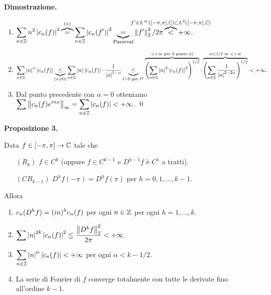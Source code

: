 \newpage

\textbf{Dimostrazione.}
\begin{enumerate}

	\item $\ds \sum_{n \in \Z} n^2 \left| c_n(f) \right|^2 \overbrace{=}^{(\ast)} \sum_{n \in \Z} \left| c_n(f') \right|^2
	\underbrace{=}_{\text{Parseval}} \norm{f'}_2^2 / 2\pi \overbrace{<}^{\mathclap{f' \in L^\infty([-\pi,\pi], \C) \subset L^2([-\pi,\pi], \C) }} +\infty$.

	\item $\displaystyle \sum_{n \in \mathbb Z} \left| n \right|^\alpha \left| c_n(f) \right| 
	\underbrace{\leq}_{(n \neq 0)} \sum_{n \in \mathbb Z} \left| n \right| \left| c_n(f) \right| \cdot \frac{1}{\left| n \right|^{1-\alpha }}
	\underbrace{\leq}_{\text{C-S per } \ell^2} \overbrace{\left( \sum_{n \in \mathbb Z} \left| n \right|^2 \left| c_n(f) \right|^2  \right)^{1/2}}^{< +\infty \text{ per il punto ii)}} \cdot \overbrace{\left( \sum_{n \in \mathbb Z} \frac{1}{\left| n \right|^{2-2\alpha }}  \right)^{1/2}}^{\alpha < 1/2 \; \Rightarrow \; <+\infty} < +\infty. 
	$

	\item Dal punto precedente con $\alpha = 0$ otteniamo $\displaystyle \sum \left\lVert c_n(f) e^{inx} \right\rVert_\infty = \sum_{n \in \mathbb Z} \left| c_n(f) \right| < +\infty $.
\qed
\end{enumerate}

\hypertarget{prop:2021-08nov_prop_3}{%
\textbf{Proposizione 3.}} Data $f \in [-\pi,\pi] \to \mathbb C$ tale che
\begin{itemize}
	\item[$(R_k)$] $f \in C^k$ (oppure $f \in C^{k-1}$ e $D^{k-1}f$ è $C^1$ a tratti).

	\item[$(CB_{k-1})$] $D^h f(-\pi) = D^h f(\pi)$ per $h = 0,1,\ldots, k-1$.
\end{itemize}
Allora
\begin{enumerate}
	\item $\displaystyle c_n (D^h f) = (in)^h c_n(f)$ per ogni $n \in \mathbb Z$ per ogni $h = 1,\ldots,k$.

	\item $\displaystyle \sum \left| n \right|^{2k} \left| c_n(f) \right|^2 \leq \frac{\left\lVert D^k f \right\rVert_2^2}{2\pi} < +\infty$.

	\item $\displaystyle \sum_{n \in \mathbb Z} \left| n \right|^\alpha \left| c_n(f) \right| < +\infty $ per ogni $\alpha < k - 1/2$.

	\item La serie di Fourier di $f$ converge totalmente con tutte le derivate fino all'ordine $k-1$.
\end{enumerate}

